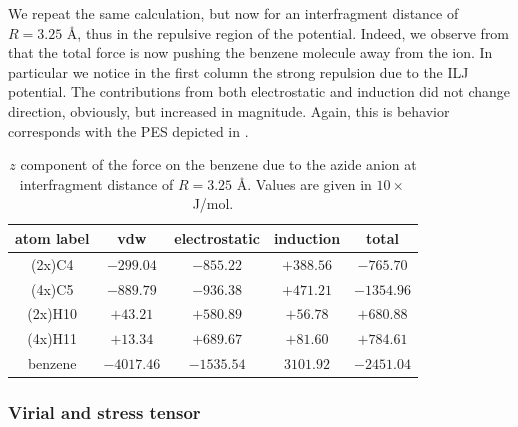 \documentclass[utf8]{article}
\begin{document}
%
We repeat the same calculation, but now for an interfragment distance of $R=3.25$ \AA, thus
in the repulsive region of the potential.
Indeed, we observe from  that the total force is now pushing
the benzene molecule away from the \ntm ion.
In particular we notice in the first column the strong repulsion due to the ILJ potential.
The contributions from both electrostatic and induction did not change direction, obviously,
but increased in magnitude. Again, this is behavior corresponds with the PES depicted in
.
%
\begin{table}
    \captionsetup{width=\textwidth}
    \centering
    \caption{$z$ component of the force on the benzene due to the azide anion
    at interfragment distance of $R=3.25$ \AA. Values are given in $10\times$J/mol.}
    \begin{tabular}{ccccc}
    \toprule
    atom label  & vdw      & electrostatic & induction & total \\
    \midrule
    (2x)C4    & $-299.04$  & $-855.22$     & $+388.56$ & $-765.70$ \\
    (4x)C5    & $-889.79$  & $-936.38$     & $+471.21$ & $-1354.96$ \\
    (2x)H10   & $+43.21$   & $+580.89$     & $+56.78$  & $+680.88$ \\
    (4x)H11   & $+13.34$   & $+689.67$     & $+81.60$  & $+784.61$ \\
    \midrule
    benzene   & $-4017.46$ & $-1535.54$    & $3101.92$ & $-2451.04$ \\
    \bottomrule
    \end{tabular}
    \label{tab:forces_benzene_rep}
\end{table}
%

\subsubsection{Virial and stress tensor}
\end{document}
